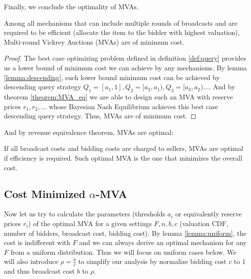 Finally, we conclude the optimality of MVAs.

\begin{theorem}\label{theorem:MVA_eq}

Among all mechanisms that can include multiple rounds of broadcasts and are
required to be efficient (allocate the item to the bidder with highest
valuation), Multi-round Vickrey Auctions (MVAs) are of minimum cost.

\end{theorem}

\begin{proof}

The best case optimizing problem defined in definition \ref{def:query} provides
us a lower bound of minimum cost we can achieve by any mechanisms.  By lemma
\ref{lemma:descending}, such lower bound minimum cost can be achieved by
descending query strategy $Q_1 = [a_1, 1], Q_2 = [a_2, a_1), Q_3 = [a_3, a_2)
\ldots$.  And by theorem \ref{theorem:MVA_eq} we are able to design such an MVA
with reserve prices $r_1, r_2, \ldots$  whose Bayesian Nash Equilibrium
achieves this best case descending query strategy.  Thus, MVAs are of minimum cost.

\end{proof}

And by revenue equivalence theorem, MVAs are optimal:

\begin{corollary}

If all broadcast costs and bidding costs are charged to sellers, MVAs are
optimal if efficiency is required.  Such optimal MVA is the one that minimizes
the overall cost.

\end{corollary}

\subsection{Cost Minimized $\alpha$-MVA}\label{sec:alpha-MVA}

Now let us try to calculate the parameters (thresholds $a_i$ or equivalently
reserve prices $r_i$) of the optimal MVA for a given settings $F, n, b, c$
(valuation CDF, number of bidders, broadcast cost, bidding cost). By lemma
\ref{lemma:uniform}, the cost is indifferent with $F$ and we can always derive
an optimal mechanism for any $F$ from a uniform distribution. Thus we will
focus on uniform cases below. We will also introduce $\rho = \frac{b}{c}$ to
simplify our analysis by normalize bidding cost $c$ to $1$ and thus broadcast
cost $b$ to $\rho$.

